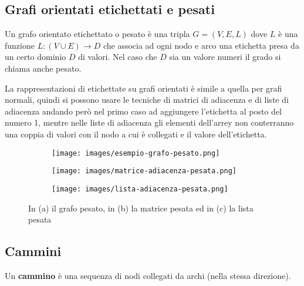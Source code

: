 \subsection{Grafi orientati etichettati e pesati}
\begin{definition}
    Un grafo orientato etichettato o pesato è una tripla $G = (V,E,L)$ dove $L$ è una funzione $L: (V \cup E) \to D$ che associa ad ogni nodo e arco una etichetta presa da un certo dominio $D$ di valori. Nel caso che $D$ sia un valore numeri il grado si chiama anche pesato.
\end{definition}
La rappresentazioni di etichettate su grafi orientati è simile a quella per grafi normali, quindi si possono usare le tecniche di matrici di adiacenza e di liste di adiacenza andando però nel primo caso ad aggiungere l'etichetta al posto del numero 1, mentre nelle liste di adiacenza gli elementi dell'arrey non conterranno una coppia di valori con il nodo a cui è collegati e il valore dell'etichetta.
\begin{figure}[h!]
    \centering
    \begin{subfigure}{.3\textwidth}
        \centering
        \texttt{[image: images/esempio-grafo-pesato.png]}
        \caption{}
    \end{subfigure}
    \hfill
    \begin{subfigure}{.3\textwidth}
        \centering
        \texttt{[image: images/matrice-adiacenza-pesata.png]}
        \caption{}
    \end{subfigure}
    \hfill
    \begin{subfigure}{.3\textwidth}
        \centering
        \texttt{[image: images/lista-adiacenza-pesata.png]}
        \caption{}
    \end{subfigure}
    \vspace{-5pt}
    \caption{In (a) il grafo pesato, in (b) la matrice pesata ed in (c) la lista pesata}
\end{figure}

\newpage
\subsection{Cammini}
\begin{definition}[Cammino]
    Un \textbf{cammino} è una sequenza di nodi collegati da archi (nella stessa direzione).
\end{definition}

